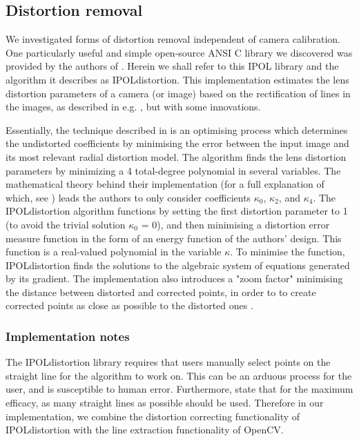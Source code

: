 
\subsection{Distortion removal}

We investigated forms of distortion removal independent of camera calibration. One particularly useful and simple open-source ANSI C library we discovered was provided by the authors of \cite{algebraic-distortion}. Herein we shall refer to this IPOL library and the algorithm it describes as IPOLdistortion. This implementation estimates the lens distortion parameters of a camera (or image) based on the rectification of lines in the images, as described in e.g. \cite{straightlines}, but with some innovations.

Essentially, the technique described in \cite{algebraic-distortion} is an optimising process which determines the undistorted coefficients by minimising the error between the input image and its most relevant radial distortion model. The algorithm finds the lens distortion parameters by minimizing a 4 total-degree polynomial in several variables. The mathematical theory behind their implementation (for a full explanation of which, see \cite{algebraic-distortion}) leads the authors to only consider coefficients $\kappa_{0}$, $\kappa_{2}$, and $\kappa_{4}$. The IPOLdistortion algorithm functions by setting the first distortion parameter to 1 (to avoid the trivial solution $\kappa_{0}$ = 0), and then minimising a distortion error measure function in the form of an energy function of the authors' design. This function is a real-valued polynomial in the variable $\kappa$. To minimise the function, IPOLdistortion finds the solutions to the algebraic system of equations generated by its gradient. The implementation also introduces a "zoom factor" minimising the distance between distorted and corrected points, in order to to create corrected points as close as possible to the distorted ones \cite{algebraic-distortion}.

\subsubsection{Implementation notes}

The IPOLdistortion library requires that users manually select points on the straight line for the algorithm to work on. This can be an arduous process for the user, and is susceptible to human error. Furthermore, \cite{algebraic-distortion} state that for the maximum efficacy, as many straight lines as possible should be used. Therefore in our implementation, we combine the distortion correcting functionality of IPOLdistortion with the line extraction functionality of OpenCV. 

